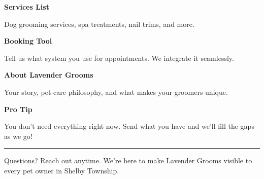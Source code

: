 \documentclass[11pt,letterpaper]{article}
\begin{document}
\begin{minipage}[t]{0.48\textwidth}
\begin{tcolorbox}[colframe=accent-teal, boxrule=1pt, left=0.7em, right=0.7em, top=0.5em, bottom=0.5em, arc=4pt, boxsep=0pt]
{\bfseries\small\color{accent-teal}Services List}

\vspace{0.15em}

{\small Dog grooming services, spa treatments, nail trims, and more.}
\end{tcolorbox}

\vspace{0.1em}

\begin{tcolorbox}[colframe=accent-teal, boxrule=1pt, left=0.7em, right=0.7em, top=0.5em, bottom=0.5em, arc=4pt, boxsep=0pt]
{\bfseries\small\color{accent-teal}Booking Tool}

\vspace{0.15em}

{\small Tell us what system you use for appointments. We integrate it seamlessly.}
\end{tcolorbox}

\vspace{0.1em}

\begin{tcolorbox}[colframe=accent-teal, boxrule=1pt, left=0.7em, right=0.7em, top=0.5em, bottom=0.5em, arc=4pt, boxsep=0pt]
{\bfseries\small\color{accent-teal}About Lavender Grooms}

\vspace{0.15em}

{\small Your story, pet‑care philosophy, and what makes your groomers unique.}
\end{tcolorbox}

\vspace{-0.2em}
\end{minipage}

\vspace{0.15em}

\begin{tcolorbox}[colback={accent-red!5}, colframe=accent-red!20, boxrule=0.5pt, left=0.7em, right=0.7em, top=0.4em, bottom=0.4em, arc=6pt, boxsep=0pt]

{\bfseries\small\color{accent-red}Pro Tip}

\vspace{0.1em}

{\small You don't need everything right now. Send what you have and we'll fill the gaps as we go!}

\end{tcolorbox}

\vspace{0.15em}

\noindent\hrule
\vspace{0.2em}

{\small\color{text-light}Questions? Reach out anytime. We're here to make Lavender Grooms visible to every pet owner in Shelby Township.}
\end{document}
